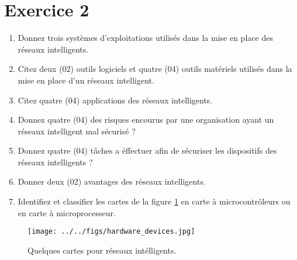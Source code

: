 \section*{Exercice 2 \MarksThree}
\begin{enumerate}
    \item Donnez trois systèmes d'exploitations utilisés dans la mise en place des réseaux intelligents.
    \item Citez deux (02) outils logiciels et quatre (04) outils matériels utilisés
          dans la mise en place d'un réseaux intelligent.
    \item Citez quatre (04) applications des réseaux intelligents.
    \item Donnez quatre (04) des risques encourus par une organisation ayant un réseaux intelligent mal sécurisé ?
    \item Donnez quatre (04) tâches a éffectuer afin de sécuriser les dispositifs des réseaux intelligents ?
    \item Donner deux (02) avantages des réseaux intelligents.
    \item Identifiez et classifier les cartes de la figure \ref{fig:carte} en carte à microcontrôleurs ou en carte à microprocesseur.
\end{enumerate}

\begin{figure}[!ht]
    \centering
    \texttt{[image: ../../figs/hardware\_devices.jpg]}
    \caption{Quelques cartes pour réseaux intélligents.\label{fig:carte}}
\end{figure}